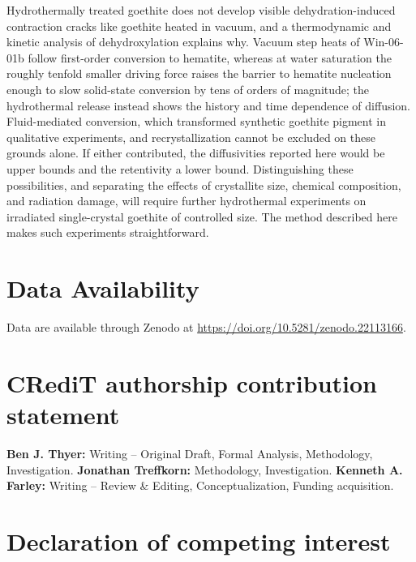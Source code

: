 Hydrothermally treated goethite does not develop visible dehydration-induced contraction cracks like goethite heated in vacuum, and a thermodynamic and kinetic analysis of dehydroxylation explains why. Vacuum step heats of Win-06-01b follow first-order conversion to hematite, whereas at water saturation the roughly tenfold smaller driving force raises the barrier to hematite nucleation enough to slow solid-state conversion by tens of orders of magnitude; the hydrothermal release instead shows the history and time dependence of diffusion. Fluid-mediated conversion, which transformed synthetic goethite pigment in qualitative experiments, and recrystallization cannot be excluded on these grounds alone. If either contributed, the diffusivities reported here would be upper bounds and the retentivity a lower bound. Distinguishing these possibilities, and separating the effects of crystallite size, chemical composition, and radiation damage, will require further hydrothermal experiments on irradiated single-crystal goethite of controlled size. The method described here makes such experiments straightforward.

\section*{Data Availability}

Data are available through Zenodo at \url{https://doi.org/10.5281/zenodo.22113166}.

\section*{CRediT authorship contribution statement}

\textbf{Ben J. Thyer:} Writing -- Original Draft, Formal Analysis, Methodology, Investigation. \textbf{Jonathan Treffkorn:} Methodology, Investigation. \textbf{Kenneth A. Farley:} Writing -- Review \& Editing, Conceptualization, Funding acquisition.

\section*{Declaration of competing interest}

